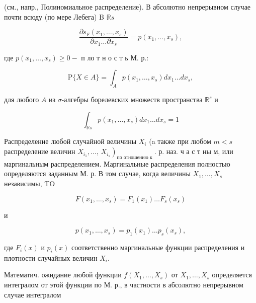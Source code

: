 \documentclass[10pt]{article}
\begin{document}
(см., напр., Полиномиальное распределение). В абсолютно непрерывном случае почти всюду (по мере Лебега) B $\mathbb{R} s$



\[

\frac{\partial s_{F}\left(x_{1}, \ldots, x_{s}\right)}{\partial x_{1} \ldots \partial x_{s}}=p\left(x_{1}, \ldots, x_{s}\right),

\]



где $p\left(x_{1}, \ldots, x_{s}\right) \geqslant 0-$ п ло т н о с т ь М. р.:



\[

\mathrm{P}\{X \in A\}=\int_{A} p\left(x_{1}, \ldots, x_{s}\right) d x_{1} \ldots d x_{s},

\]



для любого $A$ из $\sigma$-алгебры борелевских множеств пространства $\mathbb{R}^{s}$ и



\[

\int_{\mathbb{R} s} p\left(x_{1}, \ldots, x_{s}\right) d x_{1} \ldots d x_{s}=1

\]



Распределение любой случайной величины $X_{i}$ (a также при любом $m<s$ распределение величин $X_{i_{1}}, \ldots$, $\left.X_{i_{s}}\right)_{\text {по отношению к }}$. р. наз. ч а с т ны м, или маргинальным распределением. Маргинальные распределения полностью определяются заданным М. р. В том случае, когда величины $X_{1}, \ldots, X_{s}$ независимы, TO



\[

F\left(x_{1}, \ldots, x_{s}\right)=F_{1}\left(x_{1}\right) \ldots F_{s}\left(x_{s}\right)

\]



и



\[

p\left(x_{1}, \ldots, x_{s}\right)=p_{1}\left(x_{1}\right) \ldots p_{s}\left(x_{s}\right),

\]



где $F_{i}(x)$ и $p_{i}(x)$ соответственно маргинальные функции распределения и плотности случайных величин $X_{i}$.



Математич. ожидание любой функции $f\left(X_{1}, \ldots, X_{s}\right)$ от $X_{1}, \ldots, X_{s}$ определяется интегралом от этой функции по М. р., в частности в абсолютно непрерывном случае интегралом
\end{document}
